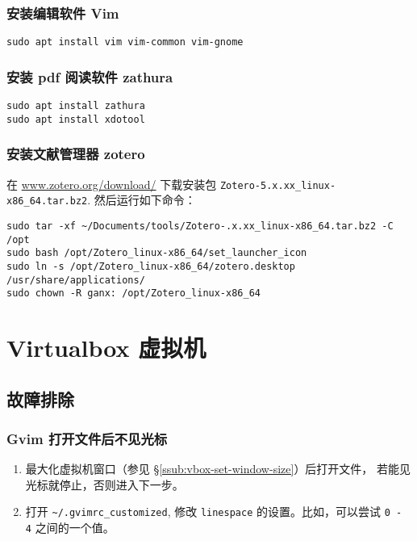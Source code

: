\documentclass[
    11pt,
    base=hide,
    cite=authoryear,
    device=phone,
    lang=cn,
    mode=simple,
    result=answer,
    toc=onecol,
]{elegantbook_sierxue}
\begin{document}
\subsubsection{安装编辑软件 Vim}%
\label{ssub:vm-apt-vim}

\begin{lstlisting}[escapeinside=``]
sudo apt install vim vim-common vim-gnome
\end{lstlisting}

\subsubsection{安装 pdf 阅读软件 zathura}%
\label{ssub:vm-zathura}

\begin{lstlisting}[escapeinside=``]
sudo apt install zathura
sudo apt install xdotool
\end{lstlisting}

\subsubsection{安装文献管理器 zotero}%
\label{ssub:vm-zotero}

在 \href{https://www.zotero.org/download/}{www.zotero.org/download/}
下载安装包 \lstinline{Zotero-5.x.xx_linux-x86_64.tar.bz2}.
然后运行如下命令：
\begin{lstlisting}[escapeinside=``]
sudo tar -xf ~/Documents/tools/Zotero-.x.xx_linux-x86_64.tar.bz2 -C /opt
sudo bash /opt/Zotero_linux-x86_64/set_launcher_icon
sudo ln -s /opt/Zotero_linux-x86_64/zotero.desktop /usr/share/applications/
sudo chown -R ganx: /opt/Zotero_linux-x86_64
\end{lstlisting}

\section{Virtualbox 虚拟机}%
\label{sec:vbox-a}

\subsection{故障排除}%
\label{sub:vim-troubleshooting}

\subsubsection{Gvim 打开文件后不见光标}%
\label{ssub:vim-ts-cursor}

\begin{enumerate}
    \item 最大化虚拟机窗口（参见
        \S\ref{ssub:vbox-set-window-size}）后打开文件，
        若能见光标就停止，否则进入下一步。
    \item 打开 \lstinline{~/.gvimrc_customized}, 修改
        \lstinline{linespace} 的设置。比如，可以尝试  \lstinline{0 - 4}
        之间的一个值。
\end{enumerate}

\printindex
\printglossary[title={术语表}]
\end{document}
